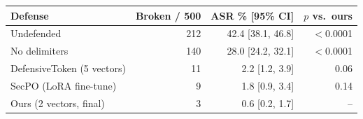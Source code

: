\begin{tabular}{lrrr}
\toprule
Defense & Broken / 500 & ASR \% [95\% CI] & $p$ vs.\ ours \\
\midrule
Undefended & 212 & 42.4 [38.1, 46.8] & $<$0.0001 \\
No delimiters & 140 & 28.0 [24.2, 32.1] & $<$0.0001 \\
DefensiveToken (5 vectors) & 11 & 2.2 [1.2, 3.9] & 0.06 \\
SecPO (LoRA fine-tune) & 9 & 1.8 [0.9, 3.4] & 0.14 \\
Ours (2 vectors, final) & 3 & 0.6 [0.2, 1.7] & -- \\
\bottomrule
\end{tabular}
